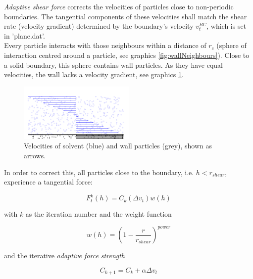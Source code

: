 \textit{Adaptive shear force} corrects the velocities of particles close to non-periodic boundaries. The tangential components of these velocities shall match the shear rate (velocity gradient) determined by the boundary's velocity $v_t^{ BC}$, which is set in 'plane.dat'.\\Every particle interacts with those neighbours within a distance of $r_c$ (sphere of interaction centred around a particle, see graphics \ref{fig:wallNeighbours}). Close to a solid boundary, this sphere contains wall particles. As they have equal velocities, the wall lacks a velocity gradient, see graphics \ref{fig:adaptShear}.

\begin{figure}
\includegraphics[width=0.5\textwidth]{adaptiveShearForce.pdf}
\caption{Velocities of solvent (blue) and wall particles (grey), shown as arrows.\label{fig:adaptShear}}
\end{figure}

In order to correct this, all particles close to the boundary, i.e. $h < r_{ shear}$, experience a tangential force:

\begin{equation} \label{eq:adaptive_shear_force}
F_t^k(h) = C_k\left(\Delta v_t \right) w(h)
\end{equation}

with $k$ as the iteration number and the weight function

\begin{equation} \label{eq:adaptive_sf_weight_fct}
w(h) = \left(1 - \frac{r}{r_{shear}} \right)^{power}
\end{equation}

and the iterative \textit{adaptive force strength}

\begin{equation} \label{eq:adaptive_force_strength}
C_{k+1} = C_k + \alpha \Delta v_t
\end{equation}

